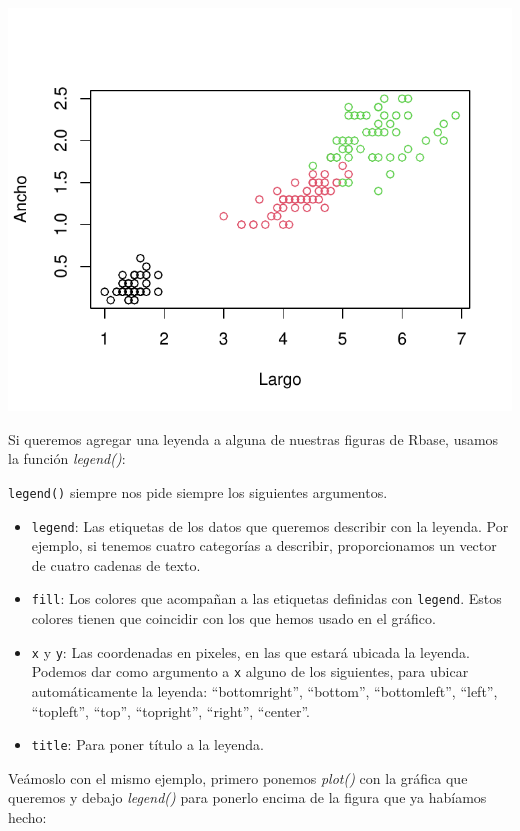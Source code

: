 \documentclass[
]{book}
\begin{document}
\begin{center}\includegraphics{R_Manual_files/figure-latex/unnamed-chunk-192-1} \end{center}

Si queremos agregar una leyenda a alguna de nuestras figuras de Rbase, usamos la función \emph{legend()}:

\texttt{legend()} siempre nos pide siempre los siguientes argumentos.

\begin{itemize}
\item
  \texttt{legend}: Las etiquetas de los datos que queremos describir con la leyenda.
  Por ejemplo, si tenemos cuatro categorías a describir, proporcionamos un vector de cuatro cadenas de texto.
\item
  \texttt{fill}: Los colores que acompañan a las etiquetas definidas con \texttt{legend}.
  Estos colores tienen que coincidir con los que hemos usado en el gráfico.
\item
  \texttt{x} y \texttt{y}: Las coordenadas en pixeles, en las que estará ubicada la leyenda.
  Podemos dar como argumento a \texttt{x} alguno de los siguientes, para ubicar automáticamente la leyenda: ``bottomright'', ``bottom'', ``bottomleft'', ``left'', ``topleft'', ``top'', ``topright'', ``right'', ``center''.
\item
  \texttt{title}: Para poner título a la leyenda.
\end{itemize}

\hfill\break
Veámoslo con el mismo ejemplo, primero ponemos \emph{plot()} con la gráfica que queremos y debajo \emph{legend()} para ponerlo encima de la figura que ya habíamos hecho:\\
\end{document}
